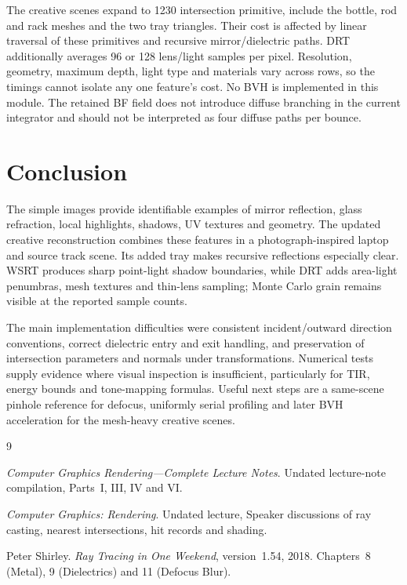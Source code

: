 \documentclass[11pt,a4paper]{article}
\begin{document}
The creative scenes expand to 1230 intersection primitive, include the bottle, rod and rack meshes and the two tray triangles. Their cost is affected by linear traversal of these primitives and recursive mirror/dielectric paths. DRT additionally averages 96 or 128 lens/light samples per pixel. Resolution, geometry, maximum depth, light type and materials vary across rows, so the timings cannot isolate any one feature's cost. No BVH is implemented in this module. The retained BF field does not introduce diffuse branching in the current integrator and should not be interpreted as four diffuse paths per bounce.

\section{Conclusion}
The simple images provide identifiable examples of mirror reflection, glass refraction, local highlights, shadows, UV textures and geometry. The updated creative reconstruction combines these features in a photograph-inspired laptop and source track scene. Its added tray makes recursive reflections especially clear. WSRT produces sharp point-light shadow boundaries, while DRT adds area-light penumbras, mesh textures and thin-lens sampling; Monte Carlo grain remains visible at the reported sample counts.

The main implementation difficulties were consistent incident/outward direction conventions, correct dielectric entry and exit handling, and preservation of intersection parameters and normals under transformations. Numerical tests supply evidence where visual inspection is insufficient, particularly for TIR, energy bounds and tone-mapping formulas. Useful next steps are a same-scene pinhole reference for defocus, uniformly serial profiling and later BVH acceleration for the mesh-heavy creative scenes.

\begin{thebibliography}{9}
\raggedright

\emph{Computer Graphics Rendering---Complete Lecture Notes}.
Undated lecture-note compilation, Parts~I, III, IV and VI.

\emph{Computer Graphics: Rendering}.
Undated lecture, Speaker discussions of ray casting,
nearest intersections, hit records and shading.

Peter Shirley.
\emph{Ray Tracing in One Weekend}, version~1.54, 2018.
Chapters~8 (Metal), 9 (Dielectrics) and 11 (Defocus Blur).

\end{thebibliography}
\end{document}
